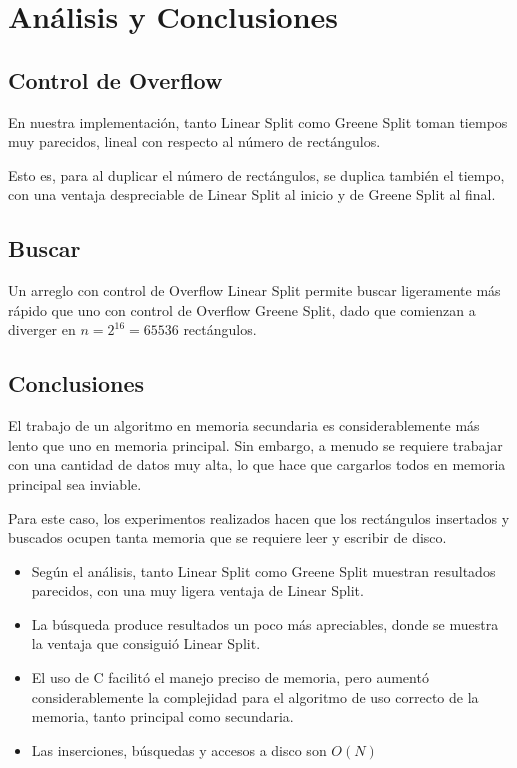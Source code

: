 \documentclass[letterpaper,10pt]{article}
\begin{document}
	\newpage

	\section{Análisis y Conclusiones}

	\subsection{Control de Overflow}

	En nuestra implementación, tanto Linear Split como Greene Split toman tiempos muy parecidos, lineal con respecto al número de rectángulos.

	Esto es, para al duplicar el número de rectángulos, se duplica también el tiempo, con una ventaja despreciable de Linear Split al inicio y de Greene Split al final.

	\subsection{Buscar}

	Un arreglo con control de Overflow Linear Split permite buscar ligeramente más rápido que uno con control de Overflow Greene Split, dado que comienzan a diverger en
	$n = 2^{16} = 65536$ rectángulos.

	\subsection{Conclusiones}

	El trabajo de un algoritmo en memoria secundaria es considerablemente más lento que uno en memoria principal. Sin embargo, a menudo se requiere trabajar con una cantidad de datos
	muy alta, lo que hace que cargarlos todos en memoria principal sea inviable.

	Para este caso, los experimentos realizados hacen que los rectángulos insertados y buscados ocupen tanta memoria que se requiere leer y escribir de disco.

	\begin{itemize}
		\item Según el análisis, tanto Linear Split como Greene Split muestran resultados parecidos, con una muy ligera ventaja de Linear Split.
		\item La búsqueda produce resultados un poco más apreciables, donde se muestra la ventaja que consiguió Linear Split.
		\item El uso de C facilitó el manejo preciso de memoria, pero aumentó considerablemente la complejidad para el algoritmo de uso correcto de la memoria, tanto
		principal como secundaria.
		\item Las inserciones, búsquedas y accesos a disco son $O(N)$
	\end{itemize}
\end{document}

